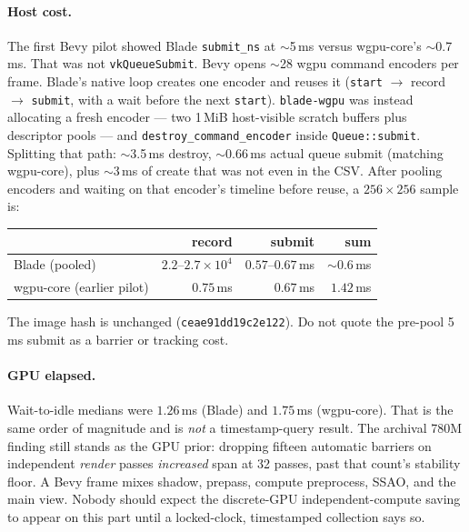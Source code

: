 \documentclass[10pt,twocolumn]{article}
\begin{document}
\paragraph{Host cost.}
The first Bevy pilot showed Blade \texttt{submit\_ns} at $\sim$5\,ms
versus wgpu-core's $\sim$0.7\,ms. That was not \texttt{vkQueueSubmit}.
Bevy opens $\sim$28 wgpu command encoders per frame. Blade's native
loop creates one encoder and reuses it (\texttt{start} $\to$ record
$\to$ \texttt{submit}, with a wait before the next \texttt{start}).
\texttt{blade-wgpu} was instead allocating a fresh encoder --- two 1\,MiB
host-visible scratch buffers plus descriptor pools --- and
\texttt{destroy\_command\_encoder} inside \texttt{Queue::submit}.
Splitting that path: $\sim$3.5\,ms destroy, $\sim$0.66\,ms actual
queue submit (matching wgpu-core), plus $\sim$3\,ms of create that
was not even in the CSV. After pooling encoders and waiting on that
encoder's timeline before reuse, a $256\times256$ sample is:

\begin{center}
\small
\begin{tabular}{@{}lrrr@{}}
\toprule
 & record & submit & sum \\
\midrule
Blade (pooled) & $2.2$--$2.7\times 10^{4}$ & $0.57$--$0.67$\,ms & $\sim$0.6\,ms \\
wgpu-core (earlier pilot) & $0.75$\,ms & $0.67$\,ms & $1.42$\,ms \\
\bottomrule
\end{tabular}
\end{center}

The image hash is unchanged (\texttt{ceae91dd19c2e122}). Do not quote
the pre-pool 5\,ms submit as a barrier or tracking cost.

\paragraph{GPU elapsed.}
Wait-to-idle medians were $1.26$\,ms (Blade) and $1.75$\,ms (wgpu-core).
That is the same order of magnitude and is \emph{not} a timestamp-query
result. The archival 780M finding still stands as the GPU prior:
dropping fifteen automatic barriers on independent \emph{render} passes
\emph{increased} span at 32 passes, past that count's stability floor.
A Bevy frame mixes shadow, prepass, compute preprocess, SSAO, and the
main view. Nobody should expect the discrete-GPU independent-compute
saving to appear on this part until a locked-clock, timestamped
collection says so.
\end{document}
